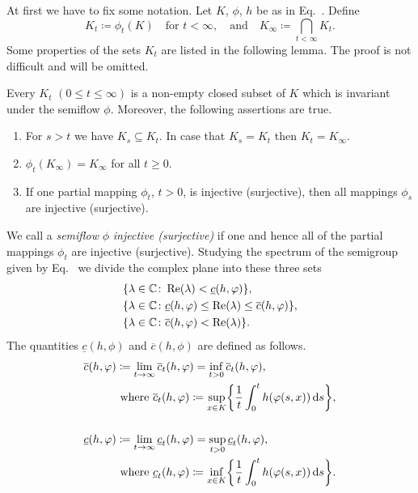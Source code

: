 At first we have to fix some notation.
Let $K$, $\phi$, $h$ be as in Eq.~. 
Define
\begin{equation}\label{eq:b3-4.2}
K_{t} \coloneq \phi_{t}(K) \quad \text{for } t < \infty,\quad\text{and}\quad K_{\infty} \coloneq \bigcap_{t < \infty} K_{t}.
\end{equation}
Some properties of the sets $K_t$  are listed in the following lemma.
The proof is not difficult and will be omitted. 
\begin{lemma}\label{lem:b3-4.2}%
Every $K_{t}$ $(0 \leq t \leq \infty)$ is a non-empty closed subset of\/ $K$ which is invariant under the semiflow $\phi$.
	Moreover, the following assertions are true.
	\begin{enumerate}[\upshape (i)]
		\item 
		For $s > t$ we have $K_{s} \subseteq K_{t}$.
		In case that $K_{s} = K_{t}$ then $K_{t} = K_{\infty}$.
		
		\item
		$\phi_{t}(K_{\infty}) = K_{\infty}$ for all $t \geq 0$.
		
		\item 
		If one partial mapping $\phi_{t}$, $t > 0$, is injective (surjective), then all mappings $\phi_{s}$ are injective (surjective).
	\end{enumerate}
\end{lemma}
We call a \emph{semiflow} $\phi$ \emph{injective (surjective)} if one and hence all of the partial mappings $\phi_{t}$ are injective (surjective).
Studying the spectrum of the semigroup given by Eq.~ we divide the complex plane into these three sets
\begin{equation}\label{eq:b3-4.3}
	\begin{split}	 
		&\{\lambda \in \C \colon \Re(\lambda) < \underline{c}(h,\phi)\} ,  \\
		&\{\lambda \in \C \colon \underline{c}(h,\phi) \leq \Re(\lambda) \leq \overline{c}(h,\phi)\} ,  \\
		&\{\lambda \in \C \colon \overline{c}(h,\phi) < \Re(\lambda)\}.
	\end{split}
\end{equation}
The quantities $\underline{c}(h,\phi)$ and $\overline{c}(h,\phi)$ are defined as follows.
\begin{align}\label{eq:b3-4.4}\notag
		\overline{c}(h,\phi) &\coloneq \lim_{t\to\infty} \overline{c}_{t}(h,\phi) = \inf_{t>0} \overline{c}_{t}(h,\phi) ,  \\ \notag
        &\text{ where }
		\overline{c}_{t}(h,\phi) \coloneq \sup_{x\in K} \mleft\{\frac{1}{t}\int_{0}^{t} h(\phi(s,x)) \ds \mright\} , \notag
        \\& \\ \notag
		\underline{c}(h,\phi) &\coloneq \lim_{t\to\infty} \underline{c}_{t}(h,\phi) = \sup_{t>0} \underline{c}_{t}(h,\phi) ,  \\ \notag
        &\text{ where } 
		\underline{c}_{t}(h,\phi) \coloneq \inf_{x\in K} \mleft\{\frac{1}{t}\int_{0}^{t} h(\phi(s,x)) \ds\mright\} .
\end{align}

